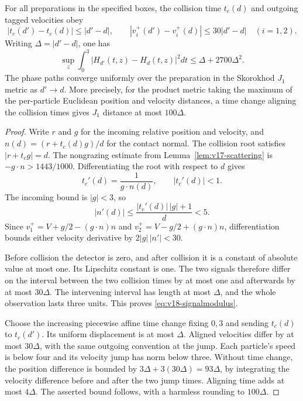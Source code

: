 \begin{lemma}
\label{lem:v18-movingcollision}
For all preparations in the specified boxes, the collision time $t_c(d)$
and outgoing tagged velocities obey
\[
 |t_c(d')-t_c(d)|\le|d'-d|,
 \qquad |v_i^+(d')-v_i^+(d)|\le30|d'-d|\quad(i=1,2).
\]
Writing $\Delta=|d'-d|$, one has
\begin{equation}\label{eq:v18-signalmodulus}
 \sup_z\int_0^3|H_{d'}(t,z)-H_d(t,z)|^2dt
                         \le\Delta+2700\Delta^2.
\end{equation}
The phase paths converge uniformly over the preparation in the
Skorokhod $J_1$ metric as $d'\to d$. More precisely, for the product
metric taking the maximum of the per-particle Euclidean position and
velocity distances, a time change aligning the collision times gives
$J_1$ distance at most $100\Delta$.
\end{lemma}
\begin{proof}
Write $r$ and $g$ for the incoming relative position and velocity, and
$n(d)=(r+t_c(d)g)/d$ for the contact normal. The collision root satisfies
$|r+t_cg|=d$. The nongrazing estimate from
Lemma~\ref{lem:v17-scattering} is
$-g\cdot n>1443/1000$. Differentiating the root with respect to $d$ gives
\[
 t_c'(d)=\frac1{g\cdot n(d)},\qquad |t_c'(d)|<1.
\]
The incoming bound is $|g|<3$, so
\[
 |n'(d)|\le\frac{|t_c'(d)|\,|g|+1}{d}<5.
\]
Since $v_1^+=V+g/2-(g\cdot n)n$ and
$v_2^+=V-g/2+(g\cdot n)n$, differentiation bounds either velocity
derivative by $2|g|\,|n'|<30$.

Before collision the detector is zero, and after collision it is a
constant of absolute value at most one. Its Lipschitz constant is one.
The two signals therefore differ on the interval between the two collision
times by at most one and afterwards by at most $30\Delta$. The intervening
interval has length at most $\Delta$, and the whole observation lasts
three units. This proves \eqref{eq:v18-signalmodulus}.

Choose the increasing piecewise affine time change fixing $0,3$ and sending
$t_c(d)$ to $t_c(d')$. Its uniform displacement is at most $\Delta$.
Aligned velocities differ by at most $30\Delta$, with the same outgoing
convention at the jump. Each particle's speed is below four and its
velocity jump has norm below three. Without time change, the position
difference is bounded by $3\Delta+3(30\Delta)=93\Delta$, by integrating
the velocity difference before and after the two jump times. Aligning time
adds at most $4\Delta$. The asserted bound follows, with a harmless
rounding to $100\Delta$.
\end{proof}

